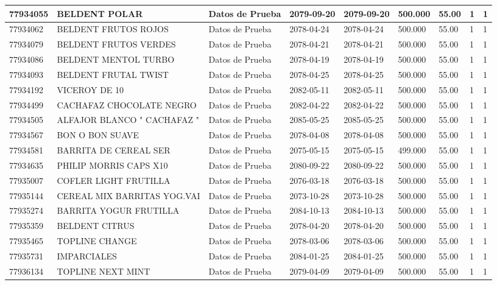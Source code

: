 \documentclass[a4paper,12pt]{article}
\begin{document}
\begin{landscape}
\begin{longtable}{|p{4cm}|p{2.5cm}|p{2.5cm}|p{1.8cm}|p{1.8cm}|p{1cm}|p{1cm}|p{3cm}|p{3cm}||}
77934055 & BELDENT POLAR & Datos de Prueba & 2079-09-20 & 2079-09-20 & 500.000 & 55.00 & 1 & 1 \\ \hline 
77934062 & BELDENT FRUTOS ROJOS & Datos de Prueba & 2078-04-24 & 2078-04-24 & 500.000 & 55.00 & 1 & 1 \\ \hline 
77934079 & BELDENT FRUTOS VERDES & Datos de Prueba & 2078-04-21 & 2078-04-21 & 500.000 & 55.00 & 1 & 1 \\ \hline 
77934086 & BELDENT MENTOL TURBO & Datos de Prueba & 2078-04-19 & 2078-04-19 & 500.000 & 55.00 & 1 & 1 \\ \hline 
77934093 & BELDENT FRUTAL TWIST & Datos de Prueba & 2078-04-25 & 2078-04-25 & 500.000 & 55.00 & 1 & 1 \\ \hline 
77934192 & VICEROY DE 10 & Datos de Prueba & 2082-05-11 & 2082-05-11 & 500.000 & 55.00 & 1 & 1 \\ \hline 
77934499 & CACHAFAZ  CHOCOLATE  NEGRO & Datos de Prueba & 2082-04-22 & 2082-04-22 & 500.000 & 55.00 & 1 & 1 \\ \hline 
77934505 & ALFAJOR  BLANCO  " CACHAFAZ " & Datos de Prueba & 2085-05-25 & 2085-05-25 & 500.000 & 55.00 & 1 & 1 \\ \hline 
77934567 & BON O BON SUAVE & Datos de Prueba & 2078-04-08 & 2078-04-08 & 500.000 & 55.00 & 1 & 1 \\ \hline 
77934581 & BARRITA DE CEREAL SER & Datos de Prueba & 2075-05-15 & 2075-05-15 & 499.000 & 55.00 & 1 & 1 \\ \hline 
77934635 & PHILIP MORRIS CAPS X10 & Datos de Prueba & 2080-09-22 & 2080-09-22 & 500.000 & 55.00 & 1 & 1 \\ \hline 
77935007 & COFLER LIGHT FRUTILLA & Datos de Prueba & 2076-03-18 & 2076-03-18 & 500.000 & 55.00 & 1 & 1 \\ \hline 
77935144 & CEREAL MIX BARRITAS YOG.VAI & Datos de Prueba & 2073-10-28 & 2073-10-28 & 500.000 & 55.00 & 1 & 1 \\ \hline 
77935274 & BARRITA YOGUR FRUTILLA & Datos de Prueba & 2084-10-13 & 2084-10-13 & 500.000 & 55.00 & 1 & 1 \\ \hline 
77935359 & BELDENT CITRUS & Datos de Prueba & 2078-04-20 & 2078-04-20 & 500.000 & 55.00 & 1 & 1 \\ \hline 
77935465 & TOPLINE CHANGE & Datos de Prueba & 2078-03-06 & 2078-03-06 & 500.000 & 55.00 & 1 & 1 \\ \hline 
77935731 & IMPARCIALES & Datos de Prueba & 2084-01-25 & 2084-01-25 & 500.000 & 55.00 & 1 & 1 \\ \hline 
77936134 & TOPLINE NEXT MINT & Datos de Prueba & 2079-04-09 & 2079-04-09 & 500.000 & 55.00 & 1 & 1 \\ \hline 

\end{longtable}
\end{landscape}
\end{document}
